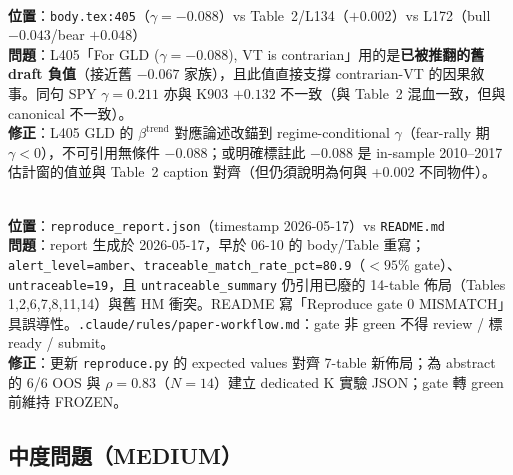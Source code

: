 \documentclass[11pt,a4paper]{article}
\newcommand{\high}{\textcolor{errorred}{\textbf{HIGH}}}
\begin{document}
\begin{description}[leftmargin=1.4em]
\item[\high\ V11-4 — GLD $\gamma$ 三版並存]\hfill\\
\textbf{位置}：\texttt{body.tex:405}（$\gamma=-0.088$）vs Table~2/L134（$+0.002$）vs L172（bull $-0.043$/bear $+0.048$）\\
\textbf{問題}：L405「For GLD ($\gamma=-0.088$), VT is contrarian」用的是\textbf{已被推翻的舊 draft 負值}（接近舊 $-0.067$ 家族），且此值直接支撐 contrarian-VT 的因果敘事。同句 SPY $\gamma=0.211$ 亦與 K903 $+0.132$ 不一致（與 Table~2 混血一致，但與 canonical 不一致）。\\
\textbf{修正}：L405 GLD 的 $\beta^{\text{trend}}$ 對應論述改錨到 regime-conditional $\gamma$（fear-rally 期 $\gamma<0$），不可引用無條件 $-0.088$；或明確標註此 $-0.088$ 是 in-sample 2010--2017 估計窗的值並與 Table~2 caption 對齊（但仍須說明為何與 +0.002 不同物件）。

\item[\high\ V11-5 — Reproduce gate 過期且 amber（paper-workflow 硬規則）]\hfill\\
\textbf{位置}：\texttt{reproduce\_report.json}（timestamp 2026-05-17）vs \texttt{README.md}\\
\textbf{問題}：report 生成於 2026-05-17，早於 06-10 的 body/Table 重寫；\texttt{alert\_level=amber}、\texttt{traceable\_match\_rate\_pct=80.9}（$<95\%$ gate）、\texttt{untraceable=19}，且 \texttt{untraceable\_summary} 仍引用已廢的 14-table 佈局（Tables 1,2,6,7,8,11,14）與舊 HM 衝突。README 寫「Reproduce gate 0 MISMATCH」具誤導性。\texttt{.claude/rules/paper-workflow.md}：gate 非 green 不得 review / 標 ready / submit。\\
\textbf{修正}：更新 \texttt{reproduce.py} 的 expected values 對齊 7-table 新佈局；為 abstract 的 6/6 OOS 與 $\rho=0.83$（$N=14$）建立 dedicated K 實驗 JSON；gate 轉 green 前維持 FROZEN。

\end{description}

\subsection*{\textcolor{warncolor}{中度問題（MEDIUM）}}
\end{document}

